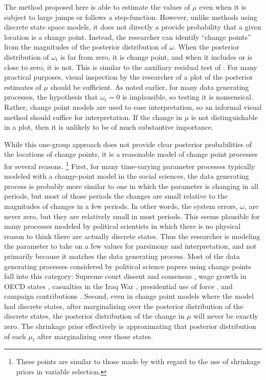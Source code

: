 \documentclass[12pt]{article}
\begin{document}
The method proposed here is able to estimate the values of $\mu$ even when it is subject to large jumps or follows a step-function.
However, unlike methods using discrete state space models, it does not directly a provide probability that a given location is a change point.
Instead, the researcher can identify ``change points'' from the magnitudes of the posterior distribution of $\omega$.
When the posterior distribution of $\omega_{t}$ is far from zero, it is change point, and when it includes or is close to zero, it is not.
This is similar to the auxiliary residual test of \textcite{DeJongPenzer1998}.
For many practical purposes, visual inspection by the researcher of a plot of the posterior estimates of $\mu$ should be sufficient.
As noted earlier, for many data generating processes, the hypothesis that $\omega_{t} = 0$ is implausible, so testing it is nonsensical.
Rather, change point models are used to ease interpretation, so an informal visual method should suffice for interpretation.
If the change in $\mu$ is not distinguishable in a plot, then it is unlikely to be of much substantive importance.

While this one-group approach does not provide clear posterior probabilities of the locations of change points, it is a reasonable model of change point processes for several reasons.%
\footnote{These points are similar to those made by \textcite[2-3]{PolsonScott2012} with regard to the use of shrinkage priors in variable selection.}
First, for many time-varying parameter processes typically modeled with a change-point model in the social sciences, the data generating process is probably more similar to one in which the parameter is changing in all periods, but most of those periods the changes are small relative to the magnitudes of changes in a few periods.
In other words, the system errors, $\omega$, are never zero, but they are relatively small in most periods.
This seems plausible for many processes modeled by political scientists in which there is no physical reason to think there are actually discrete states.
Thus the researcher is modeling the parameter to take on a few values for parsimony and interpretation, and not primarily because it matches the data generating process.
Most of the data generating processes considered by political science papers using change points fall into this category: Supreme court dissent and consensus \parencite{CalderiaZorn1998}, wage growth in OECD states \parencite{WesternKleykamp2004}, casualties in the Iraq War \parencite{Spirling2007a}, presidential use of force \parencite{Park2010}, and campaign contributions \parencite{Blackwell2012}.
Second, even in change point models where the model had discrete states, after marginalizing over the posterior distribution of the discrete states, the posterior distribution of the change in $\mu$ will never be exactly zero.
The shrinkage prior effectively is approximating that posterior distribution of each $\mu_{t}$ after marginalizing over those states.
\end{document}
